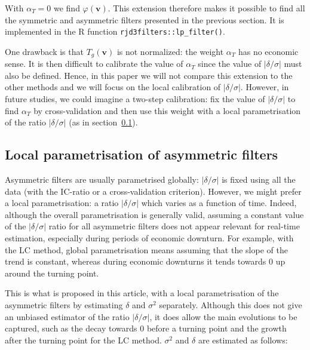 \documentclass[
]{article}
\newcommand\1{\mathds{1}}
\begin{document}
With \(\alpha_T=0\) we find \(\varphi(\boldsymbol v)\). This extension
therefore makes it possible to find all the symmetric and asymmetric
filters presented in the previous section. It is implemented in the R
function \texttt{rjd3filters::lp\_filter()}.

One drawback is that \(T_g(\boldsymbol v)\) is not normalized: the
weight \(\alpha_T\) has no economic sense. It is then difficult to
calibrate the value of \(\alpha_T\) since the value of
\(\lvert\delta/\sigma\rvert\) must also be defined. Hence, in this paper
we will not compare this extension to the other methods and we will
focus on the local calibration of \(\lvert\delta/\sigma\rvert\).
However, in future studies, we could imagine a two-step calibration: fix
the value of \(\lvert\delta/\sigma\rvert\) to find \(\alpha_T\) by
cross-validation and then use this weight with a local parametrisation
of the ratio \(\lvert\delta/\sigma\rvert\) (as in
section~\ref{sec-localic}).

\subsection{Local parametrisation of asymmetric
filters}\label{sec-localic}

Asymmetric filters are usually parametrised globally:
\(\lvert\delta/\sigma\rvert\) is fixed using all the data (with the
IC-ratio or a cross-validation criterion). However, we might prefer a
local parametrisation: a ratio \(\lvert\delta/\sigma\rvert\) which
varies as a function of time. Indeed, although the overall
parametrisation is generally valid, assuming a constant value of the
\(\lvert\delta/\sigma\rvert\) ratio for all asymmetric filters does not
appear relevant for real-time estimation, especially during periods of
economic downturn. For example, with the LC method, global
parametrisation means assuming that the slope of the trend is constant,
whereas during economic downturns it tends towards 0 up around the
turning point.

This is what is proposed in this article, with a local parametrisation
of the asymmetric filters by estimating \(\delta\) and \(\sigma^2\)
separately. Although this does not give an unbiased estimator of the
ratio \(\lvert\delta/\sigma\rvert\), it does allow the main evolutions
to be captured, such as the decay towards 0 before a turning point and
the growth after the turning point for the LC method. \(\sigma^2\) and
\(\delta\) are estimated as follows:
\end{document}
